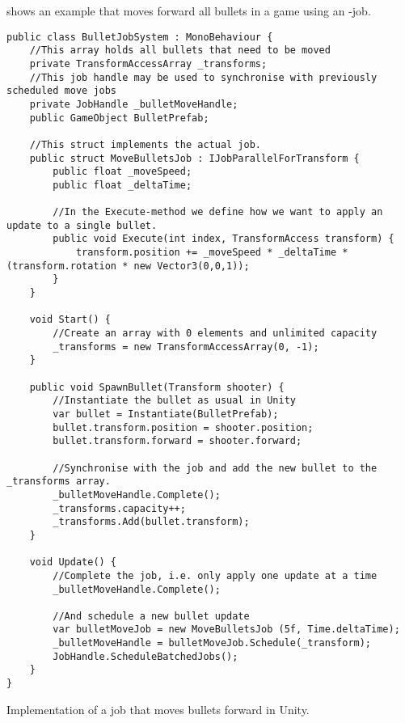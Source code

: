  shows an example that moves forward all bullets in a game using an -job.
\begin{listing}[H]
\begin{verbatim}
public class BulletJobSystem : MonoBehaviour {
    //This array holds all bullets that need to be moved
    private TransformAccessArray _transforms;
    //This job handle may be used to synchronise with previously scheduled move jobs
    private JobHandle _bulletMoveHandle;
    public GameObject BulletPrefab;

    //This struct implements the actual job.
    public struct MoveBulletsJob : IJobParallelForTransform {
        public float _moveSpeed;
        public float _deltaTime;

        //In the Execute-method we define how we want to apply an update to a single bullet.
        public void Execute(int index, TransformAccess transform) {
            transform.position += _moveSpeed * _deltaTime * (transform.rotation * new Vector3(0,0,1));
        }
    }

    void Start() {
        //Create an array with 0 elements and unlimited capacity
        _transforms = new TransformAccessArray(0, -1);
    }

    public void SpawnBullet(Transform shooter) {
        //Instantiate the bullet as usual in Unity
        var bullet = Instantiate(BulletPrefab);
        bullet.transform.position = shooter.position;
        bullet.transform.forward = shooter.forward;

        //Synchronise with the job and add the new bullet to the _transforms array.
        _bulletMoveHandle.Complete();
        _transforms.capacity++;
        _transforms.Add(bullet.transform);
    }

    void Update() {
        //Complete the job, i.e. only apply one update at a time
        _bulletMoveHandle.Complete();

        //And schedule a new bullet update
        var bulletMoveJob = new MoveBulletsJob (5f, Time.deltaTime);
        _bulletMoveHandle = bulletMoveJob.Schedule(_transform);
        JobHandle.ScheduleBatchedJobs();
    }
}
\end{verbatim}
\caption{Implementation of a job that moves bullets forward in Unity.} \label{lst:unity:job:example}
\end{listing}

